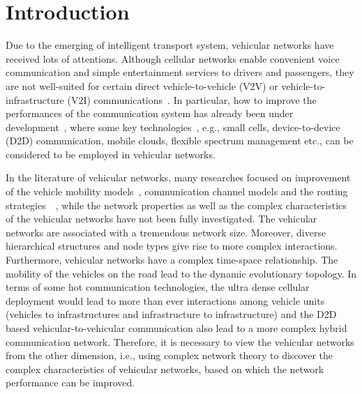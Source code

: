 \documentclass[journal,12pt,draftclsnofoot,onecolumn]{IEEEtran}
\begin{document}
%
\IEEEpeerreviewmaketitle

\section{Introduction}
\label{Introduction}
Due to the emerging of intelligent transport system, vehicular networks have received lots of attentions. Although cellular networks enable convenient voice communication and simple entertainment services to drivers and passengers, they are not well-suited for certain direct vehicle-to-vehicle (V2V) or vehicle-to-infrastructure (V2I) communications~\cite{hartenstein2008tutorial}. In particular, how to improve the performances of the communication system has already been under development~\cite{giust2015distributed}, where some key technologies~\cite{demestichas20135g}, e.g., small cells, device-to-device (D2D) communication, mobile clouds, flexible spectrum management etc., can be considered to be employed in vehicular networks.

In the literature of vehicular networks, many researches focused on improvement of the vehicle mobility models~\cite{sharef2014vehicular}, communication channel models and the routing strategies~\cite{zhang2015modeling}~\cite{jiang2014data}, while the network properties as well as the complex characteristics of the vehicular networks have not been fully investigated. The vehicular networks are associated with a tremendous network size. Moreover, diverse hierarchical structures and node types give rise to more complex interactions. Furthermore, vehicular networks have a complex time-space relationship. The mobility of the vehicles on the road lead to the dynamic evolutionary topology. In terms of some hot communication technologies, the ultra dense cellular deployment would lead to more than ever interactions among vehicle units (vehicles to infrastructures and infrastructure to infrastructure) and the D2D based vehicular-to-vehicular communication also lead to a more complex hybrid communication network. Therefore, it is necessary to view the vehicular networks from the other dimension, i.e., using complex network theory to discover the complex characteristics of vehicular networks, based on which the network performance can be improved.
\end{document}
